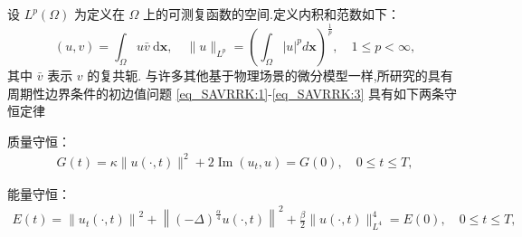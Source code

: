 设 $L^{p}(\Omega)$ 为定义在 $\Omega$ 上的可测复函数的空间.定义内积和范数如下：
\begin{equation}
(u, v)=\int_{\Omega} u \bar{v} \mathrm{~d} \boldsymbol{x}, \quad \|u\|_{L^{p}}=\left(\int_{\Omega}|u|^{p} d \boldsymbol{x}\right)^{\frac{1}{p}}, \quad 1 \leq p<\infty,
\label{eq_6}
\end{equation}
其中 $\bar{v}$ 表示 $v$ 的复共轭.
与许多其他基于物理场景的微分模型一样,所研究的具有周期性边界条件的初边值问题 \eqref{eq_SAVRRK:1}-\eqref{eq_SAVRRK:3}  具有如下两条守恒定律\cite{baoUniformErrorEstimates2012,ranLinearlyImplicitConservative2016}

质量守恒：
\begin{align}\label{eq_PAVF:_8}
    G(t)=\kappa\|u(\cdot, t)\|^{2}+2\operatorname{Im}\left(u_{t}, u\right)=G(0), \quad 0 \leq t \leq T,
    \end{align}

	能量守恒：
\begin{align}\label{eq_SAVRRK:9}
	E(t)=\left\|u_{t}(\cdot, t)\right\|^{2}+\left\|(-\Delta)^{\frac{\alpha}{4}} u(\cdot, t)\right\|^{2}+\frac{\beta}{2}\|u(\cdot, t)\|_{L^{4}}^{4}=E(0), \quad 0 \leq t \leq T,
	\end{align}

